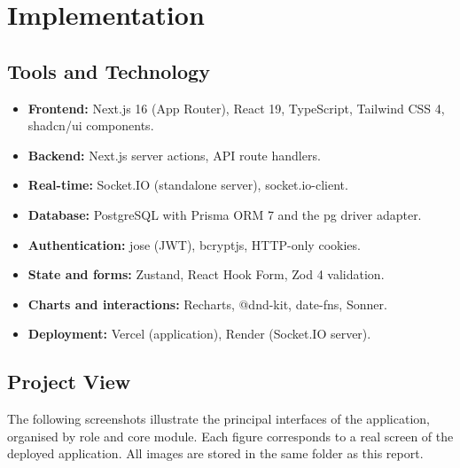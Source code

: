 \documentclass[12pt,a4paper]{report}
\begin{document}
\chapter{Implementation}
\label{ch:implementation}

\section{Tools and Technology}
\begin{itemize}
  \item \textbf{Frontend:} Next.js 16 (App Router), React 19, TypeScript,
        Tailwind CSS 4, shadcn/ui components.
  \item \textbf{Backend:} Next.js server actions, API route handlers.
  \item \textbf{Real-time:} Socket.IO (standalone server), socket.io-client.
  \item \textbf{Database:} PostgreSQL with Prisma ORM 7 and the pg driver adapter.
  \item \textbf{Authentication:} jose (JWT), bcryptjs, HTTP-only cookies.
  \item \textbf{State and forms:} Zustand, React Hook Form, Zod 4 validation.
  \item \textbf{Charts and interactions:} Recharts, @dnd-kit, date-fns, Sonner.
  \item \textbf{Deployment:} Vercel (application), Render (Socket.IO server).
\end{itemize}

\section{Project View}
The following screenshots illustrate the principal interfaces of the application,
organised by role and core module. Each figure corresponds to a real screen of the
deployed application. All images are stored in the same folder as this report.
\end{document}
